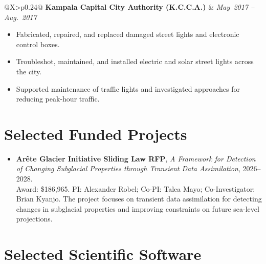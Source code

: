 \documentclass[11pt]{article}
\makeatletter
\newcommand{\entry}[4]{%
\Needspace{6\baselineskip}
\begin{tabularx}{\textwidth}{@{}X>{\raggedleft\arraybackslash}p{0.24\textwidth}@{}}
\textbf{#1} & \textit{#2} \\
\multicolumn{2}{@{}l@{}}{\textit{#3}}
\end{tabularx}
\vspace{0.2em}
#4
\vspace{0.8em}
}
\makeatother
\begin{document}
\entry{Kampala Capital City Authority (K.C.C.A.)}{May\ 2017 -- Aug.\ 2017}
{Intern}
{
\begin{itemize}[leftmargin=1.2em, itemsep=2pt, topsep=2pt]

\item Fabricated, repaired, and replaced damaged street lights and electronic control boxes.

\item Troubleshot, maintained, and installed electric and solar street lights across the city.

\item Supported maintenance of traffic lights and investigated approaches for reducing peak-hour traffic.

\end{itemize}
}

\section*{Selected Funded Projects}

\begin{itemize}[leftmargin=1.2em, itemsep=3pt, topsep=2pt]

\item \textbf{Ar\^ete Glacier Initiative Sliding Law RFP},
\textit{A Framework for Detection of Changing Subglacial Properties through Transient Data Assimilation}, 2026--2028.\\
Award: \$186,965. PI: Alexander Robel; Co-PI: Talea Mayo;
Co-Investigator: Brian Kyanjo. The project focuses on transient data assimilation for detecting changes in subglacial properties and improving constraints on future sea-level projections.

\end{itemize}

\section*{Selected Scientific Software}
\end{document}
